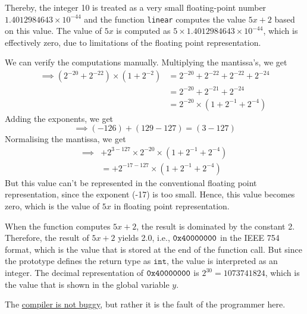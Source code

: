 Thereby, the integer 10 is treated as a very small floating-point number \( 1.4012984643 \times 10^{-44} \) and the function \texttt{linear} computes the value \( 5x + 2 \) based on this value.
The value of \( 5x \) is computed as \( 5 \times 1.4012984643 \times 10^{-44} \), which is effectively zero, due to limitations of the floating point representation.

We can verify the computations  manually.
Multiplying the mantissa's, we get
\begin{align*}
    \implies
    (2^{-20} + 2^{-22}) \times (1 + 2^{-2})
     & =
    2^{-20} + 2^{-22} + 2^{-22} + 2^{-24}
    \\ & =
    2^{-20} + 2^{-21}+ 2^{-24}
    \\ & =
    2^{-20} \times (1 + 2^{-1}+ 2^{-4})
\end{align*}
Adding the exponents, we get
\[
    \implies
    (-126) + (129 - 127)
    =
    (3 - 127)
\]
Normalising the mantissa, we get
\begin{align*}
    \implies
     &
    + 2^{3 - 127} \times 2^{-20} \times (1 + 2^{-1}+ 2^{-4})
    \\ & =
    + 2^{-17 - 127} \times (1 + 2^{-1}+ 2^{-4})
\end{align*}
But this value can't be represented in the conventional floating point representation, since the exponent (-17) is too small.
Hence, this value becomes zero, which is the value of \( 5x \) in floating point representation.

When the function computes \( 5x + 2\), the result is dominated by the constant 2.
Therefore, the result of \( 5x + 2\) yields 2.0, i.e., \( \texttt{0x40000000} \) in the IEEE 754 format, which is the value that is stored at the end of the function call.
But since the prototype defines the return type as \( \texttt{int} \), the value is interpreted as an integer.
The decimal representation of \( \texttt{0x40000000} \) is \( 2^{30} = \boxed{1073741824} \), which is the value that is shown in the global variable \( y \).

The \underline{compiler is not buggy}, but rather it is the fault of the programmer here.
